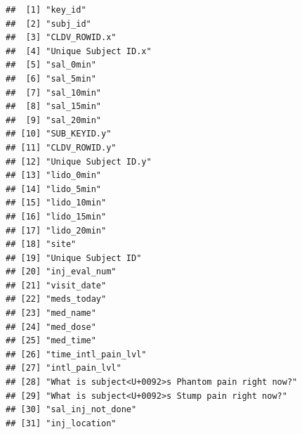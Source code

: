 \documentclass[
]{article}
\begin{document}
\begin{verbatim}
##  [1] "key_id"                                                                  
##  [2] "subj_id"                                                                 
##  [3] "CLDV_ROWID.x"                                                            
##  [4] "Unique Subject ID.x"                                                     
##  [5] "sal_0min"                                                                
##  [6] "sal_5min"                                                                
##  [7] "sal_10min"                                                               
##  [8] "sal_15min"                                                               
##  [9] "sal_20min"                                                               
## [10] "SUB_KEYID.y"                                                             
## [11] "CLDV_ROWID.y"                                                            
## [12] "Unique Subject ID.y"                                                     
## [13] "lido_0min"                                                               
## [14] "lido_5min"                                                               
## [15] "lido_10min"                                                              
## [16] "lido_15min"                                                              
## [17] "lido_20min"                                                              
## [18] "site"                                                                    
## [19] "Unique Subject ID"                                                       
## [20] "inj_eval_num"                                                            
## [21] "visit_date"                                                              
## [22] "meds_today"                                                              
## [23] "med_name"                                                                
## [24] "med_dose"                                                                
## [25] "med_time"                                                                
## [26] "time_intl_pain_lvl"                                                      
## [27] "intl_pain_lvl"                                                           
## [28] "What is subject<U+0092>s Phantom pain right now?"                        
## [29] "What is subject<U+0092>s Stump pain right now?"                          
## [30] "sal_inj_not_done"                                                        
## [31] "inj_location"                                                            

\end{verbatim}
\end{document}
